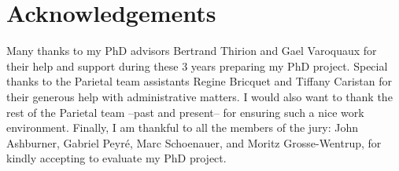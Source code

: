 \documentclass[nobib, a4paper, notoc, twoside, justified, openany]{tufte-book}
\begin{document}
\clearpage
\thispagestyle{plain}
\par{}
\chapter*{Acknowledgements}
Many thanks to my PhD advisors Bertrand Thirion and Gael Varoquaux for
their help and support during these 3 years preparing my PhD project.
Special thanks to the Parietal team assistants Regine Bricquet and Tiffany Caristan for their generous help with administrative matters.
I would also want to thank the rest of the Parietal team --past and present-- for ensuring such a nice work environment.
Finally, I am thankful to all the members of the jury: John Ashburner, Gabriel Peyr\'e, Marc Schoenauer, and Moritz Grosse-Wentrup, for kindly accepting to evaluate my PhD project.

\end{document}
